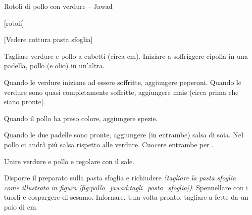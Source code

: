 \begin{recipe}{Rotoli di pollo con verdure -- Jawad}
    \begin{header}
        [rotoli]

        [Vedere cottura pasta sfoglia]
    \end{header}
    
    \begin{ingredients}[15]


        
    \end{ingredients}
    
    \begin{preparation}
        \step Tagliare verdure e pollo a cubetti (circa  cm).
        \step Iniziare a soffriggere cipolla in una padella, pollo (e olio) in un'altra.
        
        \step Quando le verdure iniziane ad essere soffritte, aggiungere peperoni.
        \step Quando le verdure sono quasi completamente soffritte, aggiungere mais (circa  prima che siano pronte).

        \step Quando il pollo ha preso colore, aggiungere spezie.

        \step Quando le due padelle sono pronte, aggiungere (in entrambe) salsa di soia. Nel pollo ci andrà più salsa rispetto alle verdure.
        \step Cuocere entrambe per .
        
        \step Unire verdure e pollo e regolare con il sale.

        \step*
        \step*
        
        \step Disporre il preparato sulla pasta sfoglia e richiudere
            \textit{(tagliare la pasta sfoglia come illustrato in figura \ref{fig:pollo_jawad:tagli_pasta_sfoglia})}.
        \step Spennellare con i tuorli e cospargere di sesamo.
        \step Infornare.
        \step Una volta pronto, tagliare a fette da un paio di cm.
    \end{preparation}


\end{recipe}
